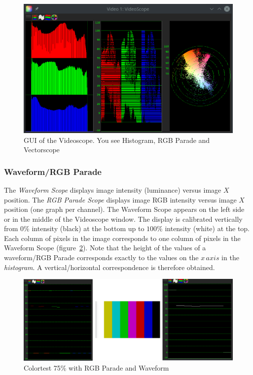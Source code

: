 \begin{figure}[hbtp]
    \centering
    \includegraphics[width=0.8\linewidth]{images/videoscope01.png}
    \caption{GUI of the Videoscope. You see Histogram, RGB Parade and Vectorscope}
    \label{fig:videoscope01}
\end{figure}

\subsubsection*{Waveform/RGB Parade}%
\label{ssub:waveform_rgb_parade}

The \textit{Waveform Scope} displays image intensity (luminance) versus image $X$ position. The \textit{RGB Parade Scope} displays image RGB intensity versus image $X$ position (one graph per channel). The Waveform Scope appears on the left side or in the middle of the Videoscope window. The display is calibrated vertically from $0\%$ intensity (black) at the bottom up to $100\%$ intensity (white) at the top. Each column of pixels in the image corresponds to one column of pixels in the Waveform Scope (figure~\ref{fig:videoscope02}). Note that the height of the values of a waveform/RGB Parade corresponds exactly to the values on the $x\, axis$ in the \textit{histogram}. A vertical/horizontal correspondence is therefore obtained.

\begin{figure}[hbtp]
    \centering
    \includegraphics[width=0.9\linewidth]{images/videoscope02.png}
    \caption{Colortest 75\% with RGB Parade and Waveform}
    \label{fig:videoscope02}
\end{figure}

